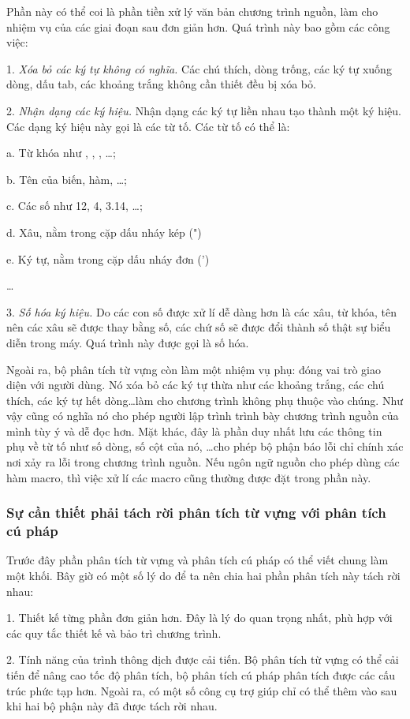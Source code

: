 Phần này có thể coi là phần tiền xử lý văn bản chương trình nguồn, làm cho nhiệm vụ của các giai đoạn sau đơn giản hơn. Quá trình này bao gồm các công việc:

1. {\itshape Xóa bỏ các ký tự không có nghĩa.} Các chú thích, dòng trống, các ký tự xuống dòng, dấu tab, các khoảng trắng không cần thiết đều bị xóa bỏ.

2. {\itshape Nhận dạng các ký hiệu.} Nhận dạng các ký tự liền nhau tạo thành một ký hiệu. Các dạng ký hiệu này gọi là các từ tố. Các từ tố có thể là:

a. Từ khóa như , , , \dots;

b. Tên của biến, hàm, \dots;

c. Các số như 12, 4, 3.14, \dots;

d. Xâu, nằm trong cặp dấu nháy kép (")

e. Ký tự, nằm trong cặp dấu nháy đơn (')

\dots

3. {\itshape Số hóa ký hiệu.} Do các con số được xử lí dễ dàng hơn là các xâu, từ khóa, tên nên các xâu sẽ được thay bằng số, các chứ số sẽ được đổi thành số thật sự biểu diễn trong máy. Quá trình này được gọi là số hóa.

Ngoài ra, bộ phân tích từ vựng còn làm một nhiệm vụ phụ: đóng vai trò giao diện với người dùng. Nó xóa bỏ các ký tự thừa như các khoảng trắng, các chú thích, các ký tự hết dòng\dots\space làm cho chương trình không phụ thuộc vào chúng. Như vậy cũng có nghĩa nó cho phép người lập trình trình bày chương trình nguồn của mình tùy ý và dễ đọc hơn. Mặt khác, đây là phần duy nhất lưu các thông tin phụ về từ tố như số dòng, số cột của nó, \dots\space cho phép bộ phận báo lỗi chỉ chính xác nơi xảy ra lỗi trong chương trình nguồn. Nếu ngôn ngữ nguồn cho phép dùng các hàm macro, thì việc xử lí các macro cũng thường được đặt trong phần này.

\subsubsection{Sự cần thiết phải tách rời phân tích từ vựng với phân tích cú pháp}
Trước đây phần phân tích từ vựng và phân tích cú pháp có thể viết chung làm một khối. Bây giờ có một số lý do để ta nên chia hai phần phân tích này tách rời nhau:

1. Thiết kế từng phần đơn giản hơn. Đây là lý do quan trọng nhất, phù hợp với các quy tắc thiết kế và bảo trì chương trình.

2. Tính năng của trình thông dịch được cải tiến. Bộ phân tích từ vựng có thể cải tiến để nâng cao tốc độ phân tích, bộ phân tích cú pháp phân tích được các cấu trúc phức tạp hơn. Ngoài ra, có một số công cụ trợ giúp chỉ có thể thêm vào sau khi hai bộ phận này đã được tách rời nhau.

